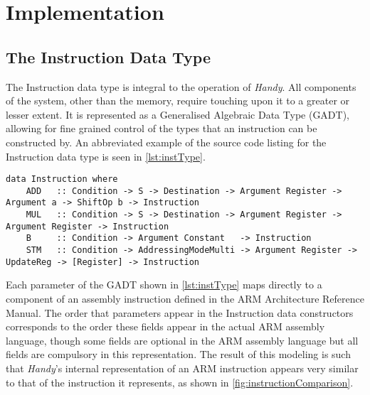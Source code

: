 
\chapter{Implementation} %

\label{ch:implementation} %


\section{The Instruction Data Type}
\label{sec:instruction}

The Instruction data type is integral to the operation of \emph{Handy}. All components of the system, other than the memory, require touching upon it to a greater or lesser extent. It is represented as a Generalised Algebraic Data Type (GADT), allowing for fine grained control of the types that an instruction can be constructed by. An abbreviated example of the source code listing for the Instruction data type is seen in \autoref{lst:instType}.

\begin{lstlisting}[numbers=none,float,caption={The Instruction data type},label={lst:instType}]
data Instruction where
    ADD   :: Condition -> S -> Destination -> Argument Register -> Argument a -> ShiftOp b -> Instruction
    MUL   :: Condition -> S -> Destination -> Argument Register -> Argument Register -> Instruction
    B     :: Condition -> Argument Constant   -> Instruction
    STM   :: Condition -> AddressingModeMulti -> Argument Register -> UpdateReg -> [Register] -> Instruction
\end{lstlisting}

Each parameter of the GADT shown in \autoref{lst:instType} maps directly to a component of an assembly instruction defined in the ARM Architecture Reference Manual. The order that parameters appear in the Instruction data constructors corresponds to the order these fields appear in the actual ARM assembly language, though some fields are optional in the ARM assembly language but all fields are compulsory in this representation. The result of this modeling is such that \emph{Handy}'s internal representation of an ARM instruction appears very similar to that of the instruction it represents, as shown in \autoref{fig:instructionComparison}.

